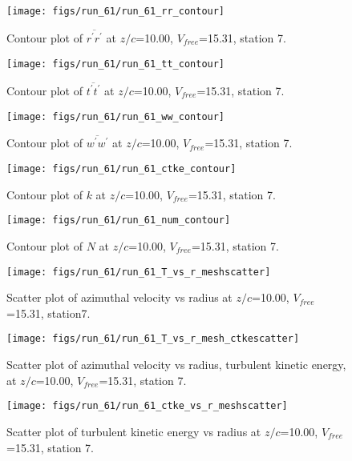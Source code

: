 \begin{figure}[H]
\centering
\texttt{[image: figs/run\_61/run\_61\_rr\_contour]}
\caption{Contour plot of $\overline{r^\prime r^\prime}$ at $z/c$=10.00, $V_{free}$=15.31, station 7.}
\label{fig:run_61_rr_contour}
\end{figure}


\begin{figure}[H]
\centering
\texttt{[image: figs/run\_61/run\_61\_tt\_contour]}
\caption{Contour plot of $\overline{t^\prime t^\prime}$ at $z/c$=10.00, $V_{free}$=15.31, station 7.}
\label{fig:run_61_tt_contour}
\end{figure}


\begin{figure}[H]
\centering
\texttt{[image: figs/run\_61/run\_61\_ww\_contour]}
\caption{Contour plot of $\overline{w^\prime w^\prime}$ at $z/c$=10.00, $V_{free}$=15.31, station 7.}
\label{fig:run_61_ww_contour}
\end{figure}


\begin{figure}[H]
\centering
\texttt{[image: figs/run\_61/run\_61\_ctke\_contour]}
\caption{Contour plot of $k$ at $z/c$=10.00, $V_{free}$=15.31, station 7.}
\label{fig:run_61_ctke_contour}
\end{figure}


\begin{figure}[H]
\centering
\texttt{[image: figs/run\_61/run\_61\_num\_contour]}
\caption{Contour plot of $N$ at $z/c$=10.00, $V_{free}$=15.31, station 7.}
\label{fig:run_61_num_contour}
\end{figure}


\begin{figure}[H]
\centering
\texttt{[image: figs/run\_61/run\_61\_T\_vs\_r\_meshscatter]}
\caption{Scatter plot of azimuthal velocity vs radius at $z/c$=10.00, $V_{free}$=15.31, station7.}
\label{fig:run_61_T_vs_r_meshscatter}
\end{figure}


\begin{figure}[H]
\centering
\texttt{[image: figs/run\_61/run\_61\_T\_vs\_r\_mesh\_ctkescatter]}
\caption{Scatter plot of azimuthal velocity vs radius, turbulent kinetic energy, at $z/c$=10.00, $V_{free}$=15.31, station 7.}
\label{fig:run_61_T_vs_r_mesh_ctkescatter}
\end{figure}


\begin{figure}[H]
\centering
\texttt{[image: figs/run\_61/run\_61\_ctke\_vs\_r\_meshscatter]}
\caption{Scatter plot of turbulent kinetic energy vs radius at $z/c$=10.00, $V_{free}$=15.31, station 7.}
\label{fig:run_61_ctke_vs_r_meshscatter}
\end{figure}


